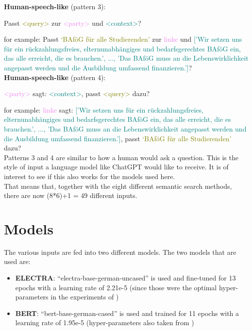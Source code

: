 \textbf{Human-speech-like} (pattern 3):

\begin{center}
    Passt \textcolor{olive}{<query>} zur \textcolor{violet}{<party>} und \textcolor{teal}{<context>}?
\end{center}

for example: Passt \textcolor{olive}{‘BAföG für alle Studierenden’} zur \textcolor{violet}{linke} und \textcolor{teal}{['Wir setzen uns für ein rückzahlungsfreies, elternunabhängiges und bedarfsgerechtes BAföG ein, das alle erreicht, die es brauchen.', ..., 'Das BAföG muss an die Lebenswirklichkeit angepasst werden und die Ausbildung umfassend finanzieren.']}? \\

\textbf{Human-speech-like} (pattern 4):

\begin{center}
    \textcolor{violet}{<party>} sagt: \textcolor{teal}{<context>}, passt \textcolor{olive}{<query>} dazu?
\end{center}
for example: \textcolor{violet}{linke} sagt: \textcolor{teal}{['Wir setzen uns für ein rückzahlungsfreies, elternunabhängiges und bedarfsgerechtes BAföG ein, das alle erreicht, die es brauchen.', ..., 'Das BAföG muss an die Lebenswirklichkeit angepasst werden und die Ausbildung umfassend finanzieren.']}, passt \textcolor{olive}{‘BAföG für alle Studierenden’} dazu? \\

Patterns 3 and 4 are similar to how a human would ask a question. This is the style of input a language model like ChatGPT \citep{chatgpt} would like to receive. It is of interest to see if this also works for the models used here. \\

That means that, together with the eight different semantic search methods, there are now (8*6)+1 = 49 different inputs.

\section{Models}

The various inputs are fed into two different models. The two models that are used are:

\begin{itemize}
    \item \textbf{ELECTRA}: ``electra-base-german-uncased'' \citep{german_electra} is used and fine-tuned for 13 epochs with a learning rate of 2.21e-5 (since those were the optimal hyper-parameters in the experiments of \citet{witte_2022})
    \item \textbf{BERT}: ``bert-base-german-cased'' \citep{german_bert} is used and trained for 11 epochs with a learning rate of 1.95e-5 (hyper-parameters also taken from \citet{witte_2022})
\end{itemize}

